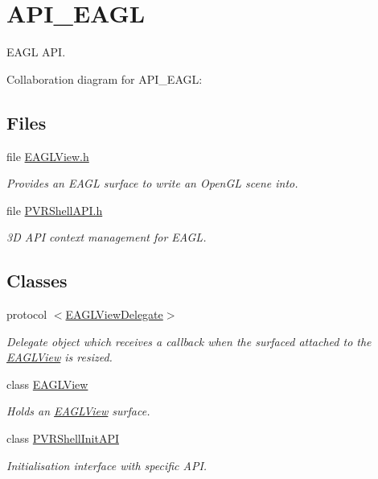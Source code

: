 \hypertarget{group___a_p_i___e_a_g_l}{\section{A\+P\+I\+\_\+\+E\+A\+G\+L}
\label{group___a_p_i___e_a_g_l}
}


E\+A\+G\+L A\+P\+I.  


Collaboration diagram for A\+P\+I\+\_\+\+E\+A\+G\+L\+:
\subsection*{Files}
\begin{DoxyCompactItemize}
\item 
file \hyperlink{_e_a_g_l_view_8h}{E\+A\+G\+L\+View.\+h}
\begin{DoxyCompactList}\small\item\em Provides an E\+A\+G\+L surface to write an Open\+G\+L scene into. \end{DoxyCompactList}\item 
file \hyperlink{_e_a_g_l_2_p_v_r_shell_a_p_i_8h}{P\+V\+R\+Shell\+A\+P\+I.\+h}
\begin{DoxyCompactList}\small\item\em 3\+D A\+P\+I context management for E\+A\+G\+L. \end{DoxyCompactList}\end{DoxyCompactItemize}
\subsection*{Classes}
\begin{DoxyCompactItemize}
\item 
protocol \hyperlink{protocol_e_a_g_l_view_delegate-p}{$<$\+E\+A\+G\+L\+View\+Delegate$>$}
\begin{DoxyCompactList}\small\item\em Delegate object which receives a callback when the surfaced attached to the \hyperlink{interface_e_a_g_l_view}{E\+A\+G\+L\+View} is resized. \end{DoxyCompactList}\item 
class \hyperlink{interface_e_a_g_l_view}{E\+A\+G\+L\+View}
\begin{DoxyCompactList}\small\item\em Holds an \hyperlink{interface_e_a_g_l_view}{E\+A\+G\+L\+View} surface. \end{DoxyCompactList}\item 
class \hyperlink{class_p_v_r_shell_init_a_p_i}{P\+V\+R\+Shell\+Init\+A\+P\+I}
\begin{DoxyCompactList}\small\item\em Initialisation interface with specific A\+P\+I. \end{DoxyCompactList}\end{DoxyCompactItemize}

